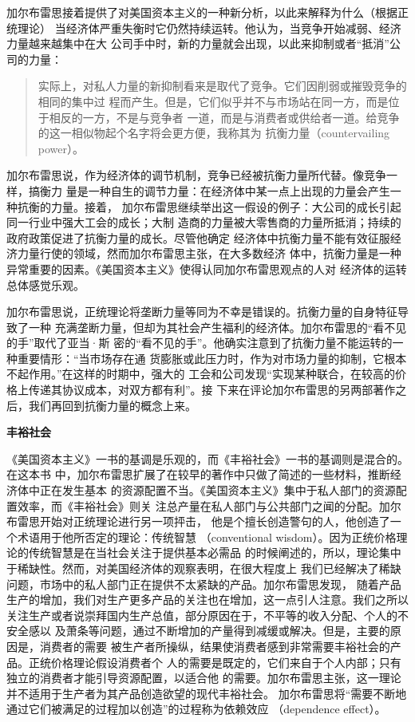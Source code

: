 加尔布雷思接着提供了对美国资本主义的一种新分析，以此来解释为什么（根据正统理论）
当经济体严重失衡时它仍然持续运转。他认为，当竞争开始减弱、经济力量越来越集中在大
公司手中时，新的力量就会出现，以此来抑制或者“抵消”公司的力量：

\begin{quotation}
  实际上，对私人力量的新抑制看来是取代了竞争。它们因削弱或摧毁竞争的相同的集中过
  程而产生。但是，它们似乎并不与市场站在同一方，而是位于相反的一方，不是与竞争者
  一道，而是与消费者或供给者一道。给竞争的这一相似物起个名字将会更方便，我称其为
  抗衡力量（countervailing power）。
\end{quotation}

加尔布雷思说，作为经济体的调节机制，竞争已经被抗衡力量所代替。像竞争一样，搞衡力
量是一种自生的调节力量：在经济体中某一点上出现的力量会产生一种抗衡的力量。接着，
加尔布雷思继续举出这一假设的例子：大公司的成长引起同一行业中强大工会的成长；大制
造商的力量被大零售商的力量所抵消；持续的政府政策促进了抗衡力量的成长。尽管他确定
经济体中抗衡力量不能有效征服经济力量行使的领域，然而加尔布雷思主张，在大多数经济
体中，抗衡力量是一种异常重要的因素。《美国资本主义》使得认同加尔布雷思观点的人对
经济体的运转总体感觉乐观。

加尔布雷思说，正统理论将垄断力量等同为不幸是错误的。抗衡力量的自身特征导致了一种
充满垄断力量，但却为其社会产生福利的经济体。加尔布雷思的“看不见的手”取代了亚当·斯
密的“看不见的手”。他确实注意到了抗衡力量不能运转的一种重要情形：“当市场存在通
货膨胀或此压力时，作为对市场力量的抑制，它根本不起作用。”在这样的时期中，强大的
工会和公司发现“实现某种联合，在较高的价格上传递其协议成本，对双方都有利”。接
下来在评论加尔布雷思的另两部著作之后，我们再回到抗衡力量的概念上来。

\textbf{\sffamily 丰裕社会}

《美国资本主义》一书的基调是乐观的，而《丰裕社会》一书的基调则是混合的。在这本书
中，加尔布雷思扩展了在较早的著作中只做了简述的一些材料，推断经济体中正在发生基本
的资源配置不当。《美国资本主义》集中于私人部门的资源配置效率，而《丰裕社会》则关
注总产量在私人部门与公共部门之闻的分配。加尔布雷思开始对正统理论进行另一项抨击，
他是个擅长创造警句的人，他创造了一个术语用于他所否定的理论：传统智慧
（conventional wisdom）。因为正统价格理论的传统智慧是在当社会关注于提供基本必需品
的时候阐述的，所以，理论集中于稀缺性。然而，对美国经济体的观察表明，在很大程度上
我们已经解决了稀缺问题，市场中的私人部门正在提供不太紧缺的产品。加尔布雷思发现，
随着产品生产的增加，我们对生产更多产品的关注也在增加，这一点引人注意。我们之所以
关注生产或者说崇拜国内生产总值，部分原因在于，不平等的收入分配、个人的不安全感以
及萧条等问题，通过不断增加的产量得到减缓或解决。但是，主要的原因是，消费者的需要
被生产者所操纵，结果使消费者感到非常需要丰裕社会的产品。正统价格理论假设消费者个
人的需要是既定的，它们来自于个人内部；只有独立的消费者才能引导资源配置，以适合他
的需要。加尔布雷思主张，这一理论并不适用于生产者为其产品创造欲望的现代丰裕社会。
加尔布雷思将“需要不断地通过它们被满足的过程加以创造”的过程称为依赖效应
（dependence effect）。

